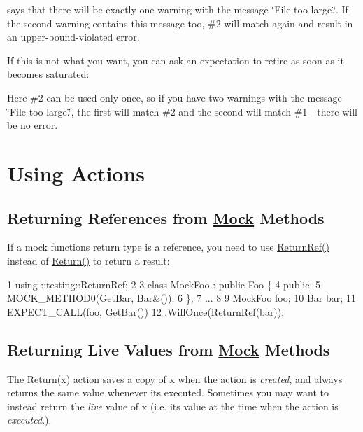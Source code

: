 says that there will be exactly one warning with the message {\ttfamily \char`\"{}\+File
too large.\char`\"{}}. If the second warning contains this message too, \#2 will match again and result in an upper-\/bound-\/violated error.

If this is not what you want, you can ask an expectation to retire as soon as it becomes saturated\+:




Here \#2 can be used only once, so if you have two warnings with the message {\ttfamily \char`\"{}\+File too large.\char`\"{}}, the first will match \#2 and the second will match \#1 -\/ there will be no error.

\section*{Using Actions}

\subsection*{Returning References from \hyperlink{class_mock}{Mock} Methods}

If a mock function\textquotesingle{}s return type is a reference, you need to use {\ttfamily \hyperlink{namespacetesting_a18eda8fe9c89ee856c199a2e04ca1641}{Return\+Ref()}} instead of {\ttfamily \hyperlink{namespacetesting_af6d1c13e9376c77671e37545cd84359c}{Return()}} to return a result\+:


\begin{DoxyCode}
1 using ::testing::ReturnRef;
2 
3 class MockFoo : public Foo \{
4  public:
5   MOCK\_METHOD0(GetBar, Bar&());
6 \};
7 ...
8 
9   MockFoo foo;
10   Bar bar;
11   EXPECT\_CALL(foo, GetBar())
12       .WillOnce(ReturnRef(bar));
\end{DoxyCode}


\subsection*{Returning Live Values from \hyperlink{class_mock}{Mock} Methods}

The {\ttfamily Return(x)} action saves a copy of {\ttfamily x} when the action is {\itshape created}, and always returns the same value whenever it\textquotesingle{}s executed. Sometimes you may want to instead return the {\itshape live} value of {\ttfamily x} (i.\+e. its value at the time when the action is {\itshape executed}.).


